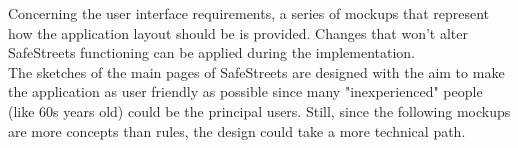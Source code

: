 Concerning the user interface requirements, a series of mockups that represent how the application layout should be is provided. Changes that won't alter SafeStreets functioning can be applied during the implementation.\\
The sketches of the main pages of SafeStreets are designed with the aim to make the application as user friendly as possible since many "inexperienced" people (like 60s years old) could be the principal users. Still, since the following mockups are more concepts than rules, the design could take a more technical path. \\

	